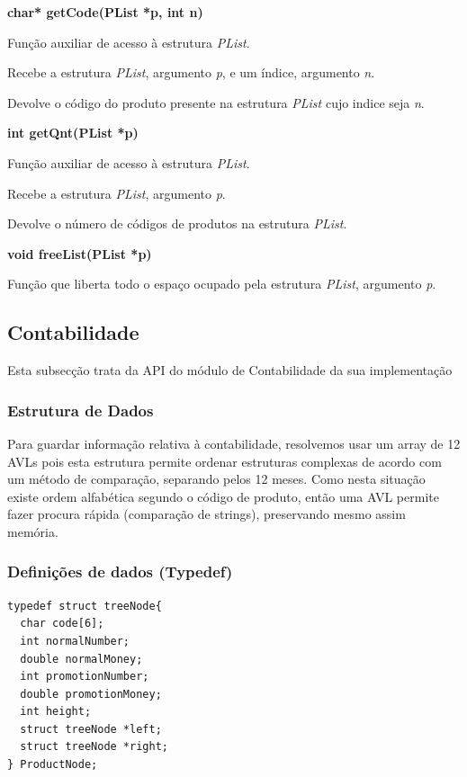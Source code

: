 \documentclass[10pt] {article}
\begin{document}
\noindent \textbf{char* getCode(PList *p, int n)}
\par Função auxiliar de acesso à estrutura \emph{PList}.
\par Recebe a estrutura \emph{PList}, argumento \emph{p}, e um índice, argumento \emph{n}.
\par Devolve o código do produto presente na estrutura \emph{PList} cujo indice seja \emph{n}.

\noindent \textbf{int getQnt(PList *p)}
\par Função auxiliar de acesso à estrutura \emph{PList}.
\par Recebe a estrutura \emph{PList}, argumento \emph{p}.
\par Devolve o número de códigos de produtos na estrutura \emph{PList}.

\noindent \textbf{void freeList(PList *p)}
\par Função que liberta todo o espaço ocupado pela estrutura \emph{PList}, argumento \emph{p}.



\subsection{Contabilidade}
\par Esta subsecção trata da API do módulo de Contabilidade da sua implementação

\subsubsection{Estrutura de Dados}
\par
Para guardar informação relativa à contabilidade, resolvemos usar um array de 12 AVLs pois esta estrutura permite ordenar estruturas complexas de acordo com um método de comparação, separando pelos 12 meses. Como nesta situação existe ordem alfabética segundo o código de produto, então uma AVL permite fazer procura rápida (comparação de strings), preservando mesmo assim memória. 

\subsubsection{Definições de dados (Typedef)}

\begin{lstlisting}
typedef struct treeNode{
  char code[6];
  int normalNumber;
  double normalMoney;
  int promotionNumber;
  double promotionMoney;
  int height;
  struct treeNode *left;
  struct treeNode *right;
} ProductNode;
\end{lstlisting}
\end{document}

